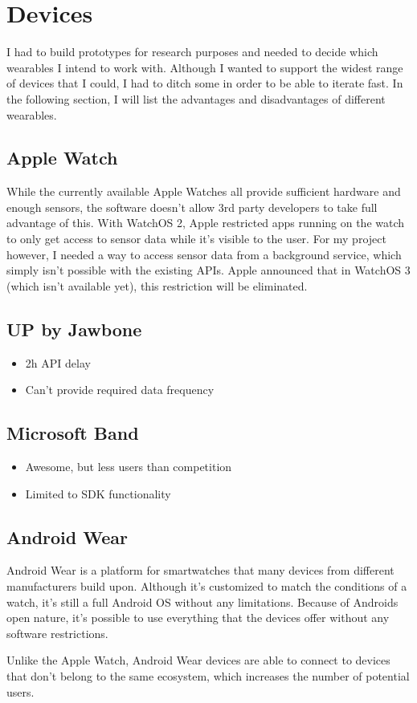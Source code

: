 \section{Devices}
\label{sec:devices}

I had to build prototypes for research purposes and needed to decide which wearables I intend to work with.
Although I wanted to support the widest range of devices that I could, I had to ditch some in order to be able to iterate fast.
In the following section, I will list the advantages and disadvantages of different wearables.

\subsection{Apple Watch}
While the currently available Apple Watches all provide sufficient hardware and enough sensors, the software doesn't allow 3rd party developers to take full advantage of this.
With WatchOS 2, Apple restricted apps running on the watch to only get access to sensor data while it's visible to the user.
For my project however, I needed a way to access sensor data from a background service, which simply isn't possible with the existing APIs.
Apple announced that in WatchOS 3 (which isn't available yet), this restriction will be eliminated. 

\subsection{UP by Jawbone}
\begin{itemize}[noitemsep]
	\item 2h API delay
	\item Can't provide required data frequency
\end{itemize}
\lipsum[1]

\subsection{Microsoft Band}
\begin{itemize}[noitemsep]
	\item Awesome, but less users than competition
	\item Limited to SDK functionality
\end{itemize}
\lipsum[1]

\subsection{Android Wear}
Android Wear is a platform for smartwatches that many devices from different manufacturers build upon.
Although it's customized to match the conditions of a watch, it's still a full Android OS without any limitations.
Because of Androids open nature, it's possible to use everything that the devices offer without any software restrictions.

Unlike the Apple Watch, Android Wear devices are able to connect to devices that don't belong to the same ecosystem, which increases the number of potential users.

\clearpage